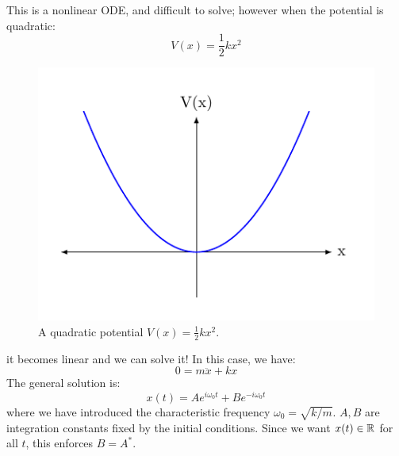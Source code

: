 This is a nonlinear ODE, and difficult to solve; however when the potential is quadratic:
\begin{equation}
    V(x) = \frac{1}{2}kx^2
\end{equation}
\begin{figure}[htbp]
    \centering
    \includegraphics[]{Lectures/Figures/quad_potential.pdf}
    \caption{A quadratic potential $V(x) = \frac{1}{2}kx^2$.}
    \label{fig:quad_potential}
\end{figure}
it becomes linear and we can solve it! In this case, we have:
\begin{equation}
    0 = m\ddot{x} + kx
\end{equation}
The general solution is:
\begin{equation}
    x(t) = Ae^{i\omega_0t} + Be^{-i\omega_0t}
\end{equation}
where we have introduced the characteristic frequency $\omega_0 = \sqrt{k/m}$. $A, B$ are integration constants fixed by the initial conditions. Since we want $x(t) \in \mathbb{R}$ for all $t$, this enforces $B = A^*$. 

